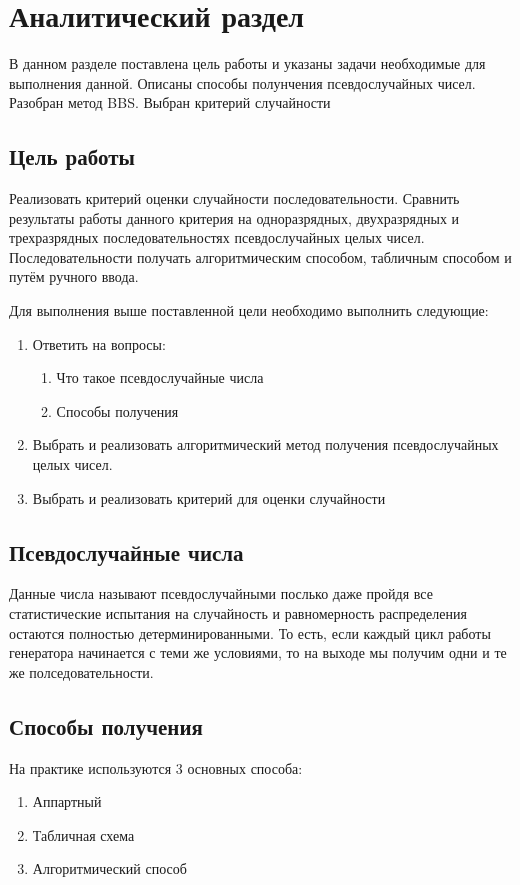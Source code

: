\section{Аналитический раздел}

В данном разделе поставлена цель работы и указаны задачи необходимые для выполнения данной. Описаны способы полунчения псевдослучайных чисел. 
Разобран метод BBS.
Выбран критерий случайности

\subsection{Цель работы}
Реализовать критерий оценки случайности последовательности. 
Сравнить результаты работы данного критерия на одноразрядных, двухразрядных и трехразрядных последовательностях псевдослучайных целых чисел.
Последовательности получать алгоритмическим способом, табличным способом и путём ручного ввода.

Для выполнения выше поставленной цели необходимо выполнить следующие:
\begin{enumerate}
	\item Ответить на вопросы:
		\begin{enumerate}
			\item Что такое псевдослучайные числа
			\item Способы получения
		\end{enumerate}
	\item Выбрать и реализовать алгоритмический метод получения псевдослучайных целых чисел.
	\item Выбрать и реализовать критерий для оценки случайности
\end{enumerate}

\subsection{Псевдослучайные числа}
Данные числа называют псевдослучайными послько даже пройдя все статистические испытания на случайность и равномерность распределения остаются полностью детерминированными. То есть, если каждый цикл работы генератора начинается с теми же условиями, то на выходе мы получим одни и те же полседовательности.

\subsection{Способы получения}
На практике используются 3 основных способа:
\begin{enumerate}
	\item Аппартный
	\item Табличная схема
	\item Алгоритмический способ
\end{enumerate}

